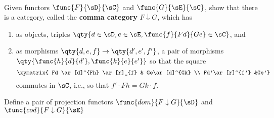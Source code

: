 \documentclass[main.tex]{subfiles}
\begin{document}
\paragraph{}

\begin{exercise}
	Given functors $\func{F}{\sD}{\sC}$ and $\func{G}{\sE}{\sC}$, show that
	there is a category, called the {\bf comma category} $F\downarrow G$, which
	has
	\begin{enumerate}
		\item as objects, triples $\qty{d \in \sD,e \in \sE, \func{f}{Fd}{Ge}
			\in \sC}$, and

		\item as morphisms $\qty{d,e,f}\rightarrow \qty{d',e',f'}$, a pair of
			morphisms $\qty{\func{h}{d}{d'},\func{k}{e}{e'}}$ so that the square
			\[\xymatrix{
					Fd \ar[d]^{Fh} \ar[r]_{f} & Ge\ar[d]^{Gk}  \\
			Fd'\ar[r]^{f'} &Ge'}\]
			commutes in $\sC$, i.e., so that $f' \cdot Fh = Gk \cdot f$.
	\end{enumerate}
	Define a pair of projection functors $\func{dom}{F\downarrow G}{\sD}$ and
	$\func{cod}{F\downarrow G}{\sE}$
\end{exercise}
\end{document}
